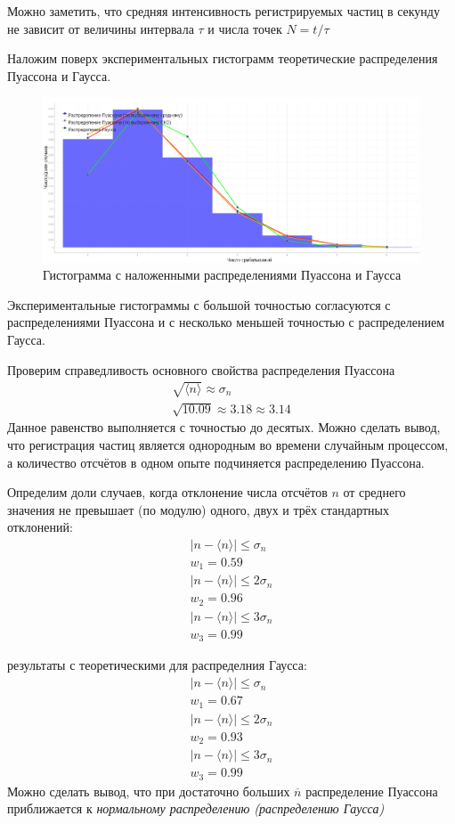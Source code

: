 \documentclass[a4paper, 12pt]{article}
\begin{document}
Можно заметить, что средняя интенсивность регистрируемых частиц в секунду не зависит от величины интервала $\tau$ и числа точек $N = t / \tau$

Наложим поверх экспериментальных гистограмм теоретические распределения Пуассона и Гаусса.
\begin{figure}[H]
\centering
\includegraphics[width=1\linewidth]{images/experiment_graph_01.png}
\caption{Гистограмма с наложенными распределениями Пуассона и Гаусса}
\end{figure}

Экспериментальные гистограммы с большой точностью согласуются с распределениями Пуассона и с несколько меньшей точностью с распределением Гаусса.

Проверим справедливость основного свойства распределения Пуассона
\begin{gather*}
\sqrt{\langle n \rangle} \approx \sigma_n\\
\sqrt{10.09} \approx 3.18  \approx 3.14
\end{gather*}
Данное равенство выполняется с точностью до десятых. Можно сделать вывод, что регистрация частиц является однородным во времени случайным процессом, а количество отсчётов в одном опыте подчиняется распределению Пуассона.

Определим доли случаев, когда отклонение числа отсчётов $n$ от среднего значения не превышает (по модулю) одного, двух и трёх стандартных отклонений:
\begin{gather*}
|n - \langle n \rangle| \leq \sigma_n\\
w_1 = 0.59\\
|n - \langle n \rangle| \leq 2\sigma_n\\
w_2 = 0.96\\
|n - \langle n \rangle| \leq 3\sigma_n\\
w_3 = 0.99
\end{gather*}

 результаты с теоретическими для распределния Гаусса:
\begin{gather*}
|n - \langle n \rangle| \leq \sigma_n\\
w_1 = 0.67\\
|n - \langle n \rangle| \leq 2\sigma_n\\
w_2 = 0.93\\
|n - \langle n \rangle| \leq 3\sigma_n\\
w_3 = 0.99
\end{gather*}
Можно сделать вывод, что при достаточно больших $\overline{n}$ распределение Пуассона приближается к \textit{нормальному распределению (распределению Гаусса)}
\end{document}
